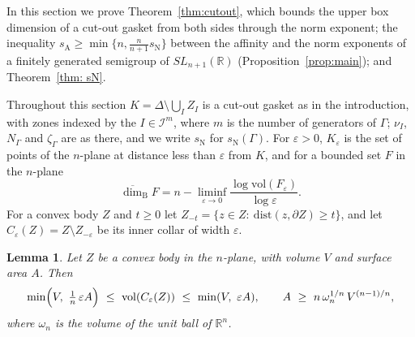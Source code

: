 \documentclass[11pt]{amsart}
\newtheorem{lemma}[proposition]{Lemma}
\theoremstyle{definition}
\theoremstyle{remark}
\newcommand{\R}{\mathbb R}
\newcommand{\cI}{\mathcal I}
\newcommand{\udimB}{\overline{\dim}_{\mathrm B}}
\newcommand{\sN}{s_{\mathrm N}}
\newcommand{\sA}{s_{\mathrm A}}
\begin{document}
In this section we prove Theorem~\ref{thm:cutout}, which bounds the upper box dimension of a cut-out gasket from both sides through the norm exponent; the inequality $\sA\ge\min\{n,\frac n{n+1}\sN\}$ between the affinity and the norm exponents of a finitely generated semigroup of $SL_{n+1}(\R)$ (Proposition~\ref{prop:main}); and Theorem~\ref{thm: sN}.

Throughout this section $K=\Delta\setminus\bigcup_IZ_I$ is a cut-out gasket as in the introduction, with zones indexed by the $I\in\cI^m$, where $m$ is the number of generators of $\Gamma$; $\nu_I$, $N_\Gamma$ and $\zeta_\Gamma$ are as there, and we write $\sN$ for $\sN(\Gamma)$. For $\varepsilon>0$, $K_\varepsilon$ is the set of points of the $n$-plane at distance less than $\varepsilon$ from $K$, and for a bounded set $F$ in the $n$-plane \cite[Prop.~3.2]{FalBook}
\begin{equation}\label{eq:minkowski}
  \udimB F=n-\liminf_{\varepsilon\to0}\frac{\log\mathrm{vol}(F_\varepsilon)}{\log\varepsilon}.
\end{equation}
For a convex body $Z$ and $t\ge0$ let $Z_{-t}=\{z\in Z:\ \mathrm{dist}(z,\partial Z)\ge t\}$, and let $C_\varepsilon(Z)=Z\setminus Z_{-\varepsilon}$ be its inner collar of width $\varepsilon$.

\begin{lemma}\label{lem:collar}
Let $Z$ be a convex body in the $n$-plane, with volume $V$ and surface area $A$. Then
\[
  \min\Bigl(V,\ \tfrac1n\,\varepsilon A\Bigr)\ \le\ \mathrm{vol}(C_\varepsilon(Z))\ \le\ \min(V,\ \varepsilon A),
  \qquad A\ \ge\ n\,\omega_n^{1/n}\,V^{(n-1)/n},
\]
where $\omega_n$ is the volume of the unit ball of $\R^n$.
\end{lemma}
\end{document}
